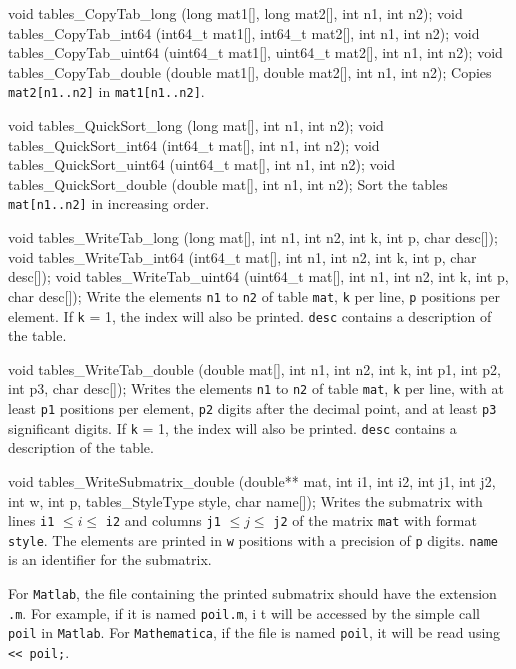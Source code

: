 void tables_CopyTab_long (long mat1[], long mat2[], int n1, int n2);
void tables_CopyTab_int64 (int64_t mat1[], int64_t mat2[], int n1, int n2);
void tables_CopyTab_uint64 (uint64_t mat1[], uint64_t mat2[], int n1, int n2);
void tables_CopyTab_double (double mat1[], double mat2[], int n1, int n2);
\endcode
  \tab Copies {\tt mat2[n1..n2]} in {\tt mat1[n1..n2]}.
  \endtab
\code

void tables_QuickSort_long (long mat[], int n1, int n2);
void tables_QuickSort_int64 (int64_t mat[], int n1, int n2);
void tables_QuickSort_uint64 (uint64_t mat[], int n1, int n2);
void tables_QuickSort_double (double mat[], int n1, int n2);
\endcode
 \tab Sort the tables {\tt mat[n1..n2]} in increasing order.
 \endtab
\code

void tables_WriteTab_long (long mat[], int n1, int n2, int k, int p, 
                           char desc[]);
void tables_WriteTab_int64 (int64_t mat[], int n1, int n2, int k, int p, 
                            char desc[]);
void tables_WriteTab_uint64 (uint64_t mat[], int n1, int n2, int k, int p, 
                             char desc[]);
\endcode
 \tab  Write the elements {\tt n1} to {\tt n2} of table {\tt mat},
  {\tt k} per line, {\tt p} positions per element.
  If  {\tt k} = 1, the index will also be printed. {\tt desc}
  contains a description of the table.
 \endtab
\code

void tables_WriteTab_double (double mat[], int n1, int n2, int k, 
                             int p1, int p2, int p3, char desc[]);
\endcode
 \tab  Writes the elements {\tt n1} to {\tt n2} of table {\tt mat},
  {\tt k} per line, with at least {\tt p1} positions per element,
  {\tt p2} digits after the decimal point, and at least  {\tt p3} significant digits.
   If {\tt k} = 1, the index
  will also be printed. {\tt desc} contains a description of the table.
 \endtab\code

void tables_WriteSubmatrix_double (double** mat, int i1, int i2, int j1, int j2,
                             int w, int p, tables_StyleType style, char name[]);
\endcode
 \tab Writes the submatrix with lines 
   {\tt i1} $\le i \le $ {\tt i2} and columns 
   {\tt j1} $\le j \le $ {\tt j2} of the matrix {\tt mat} with format
   {\tt style}. The elements are printed in {\tt w}
   positions with a precision of {\tt p} digits. {\tt name} is
   an identifier for the submatrix.
  
   For {\tt Matlab}, the file containing the printed submatrix should have 
	 the extension {\tt .m}.
   For example, if it is named {\tt poil.m}, i t will be accessed by the
   simple call {\tt poil} in {\tt Matlab}.
   For {\tt Mathematica}, if the file is named {\tt poil},
   it will be read using {\tt << poil;}.
 \endtab
\code

